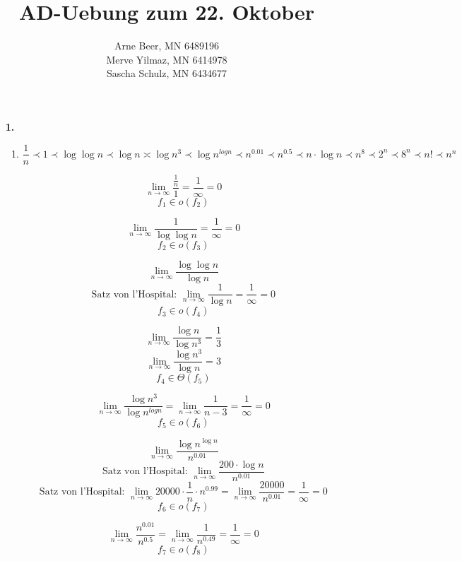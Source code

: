 \documentclass{article}
\title{AD-Uebung zum 22. Oktober}
\author{Arne Beer, MN 6489196\\
Merve Yilmaz, MN 6414978\\
Sascha Schulz, MN 6434677}
\begin{document}
\maketitle

\begin{enumerate}
    \item[\textbf{1.}]
        \begin{enumerate}
            \item
                \[ \frac{1}{n} \prec 1 \prec \log{\log{n}} \prec \log{n} \asymp \log{n^3} \prec \log{n^{log{n}}} \prec n^{0.01} 
                \prec n^{0.5} \prec n \cdot \log{n} \prec n^8 \prec 2^n \prec 8^n \prec n! \prec n^n \]
                
                \[\lim\limits_{n \rightarrow \infty}{\frac{\frac{1}{n}}{1}} = \frac{1}{\infty} = 0\]
                $$f_1 \in o(f_2)$$
                
                \[\lim\limits_{n \rightarrow \infty}{\frac{1}{\log{\log{n}}}} = \frac{1}{\infty} = 0\]
                $$f_2 \in o(f_3)$$

                \[\lim\limits_{n \rightarrow \infty}{\frac{\log{\log{n}}}{\log{n}}}\]
                \[\text{Satz von l'Hospital: } \lim\limits_{n \rightarrow \infty}{\frac{1}{\log{n}}} = \frac{1}{\infty} = 0\]
                $$f_3 \in o(f_4)$$
                
                \[\lim\limits_{n \rightarrow \infty}{\frac{\log{n}}{\log{n^3}}}
                 = \frac{1}{3}\]
                \[\lim\limits_{n \rightarrow \infty}{\frac{\log{n^3}}{\log{n}}}
                 = 3\]
                $$f_4 \in \Theta(f_5)$$
                    
                \[\lim\limits_{n \rightarrow \infty}{\frac{\log{n^3}}{\log{n^{log{n}}}}}
                = \lim\limits_{n \rightarrow \infty}{\frac{1}{n-3} = \frac{1}{\infty} = 0}\]
                $$f_5 \in o(f_6)$$

                \[\lim\limits_{n \rightarrow \infty}{\frac{\log{n^{\log{n}}}}{n^{0.01}}}\]
                \[\text{Satz von l'Hospital: } \lim\limits_{n \rightarrow \infty}{\frac{200 \cdot \log{n}}{n^{0.01}}}\] 
                \[\text{Satz von l'Hospital: } \lim\limits_{n \rightarrow \infty}{20000 \cdot \frac{1}{n} \cdot n^{0.99}
                = \lim\limits_{n \rightarrow \infty}{\frac{20000}{n^{0.01}}}} = \frac{1}{\infty} = 0\]
                $$f_6 \in o(f_7)$$

                \[\lim\limits_{n \rightarrow \infty}{\frac{n^{0.01}}{n^{0.5}}}
                = \lim\limits_{n \rightarrow \infty}{\frac{1}{n^{0.49}}} = \frac{1}{\infty} = 0\]
                $$f_7 \in o(f_8)$$


\end{enumerate}
\end{enumerate}
\end{document}
